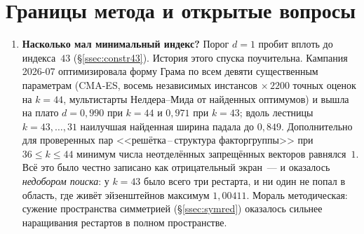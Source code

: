\section{Границы метода и открытые вопросы}\label{sec:open}

\begin{enumerate}[leftmargin=1.5em]
\item \textbf{Насколько мал минимальный индекс?} Порог $d=1$ пробит вплоть
до индекса~$43$ (\S\ref{ssec:constr43}). История этого спуска поучительна.
Кампания 2026-07 оптимизировала форму Грама по всем девяти существенным
параметрам (CMA-ES, восемь независимых инстансов $\times\,2200$ точных оценок
на $k=44$, мультистарты Нелдера--Мида от найденных оптимумов) и вышла на плато
$d=0{,}990$ при $k=44$ и $0{,}971$ при $k=43$; вдоль лестницы
$k=43,\dots,31$ наилучшая найденная ширина падала до $0{,}849$. Дополнительно
для проверенных пар <<решётка\,--\,структура факторгруппы>> при $36\le k\le44$
минимум числа неотделённых запрещённых векторов равнялся~$1$. Всё это было
честно записано как отрицательный экран~--- и оказалось \emph{недобором
поиска}: у $k=43$ было всего три рестарта, и ни один не попал в область, где
живёт эйзенштейнов максимум $1{,}00411$. Мораль методическая: сужение
пространства симметрией (\S\ref{ssec:symred}) оказалось сильнее наращивания
рестартов в полном пространстве.


\end{enumerate}
